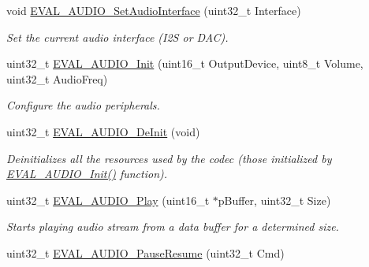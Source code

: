 \begin{DoxyCompactItemize}
\item 
void \hyperlink{group___s_t_m32_f4___d_i_s_c_o_v_e_r_y___a_u_d_i_o___c_o_d_e_c___exported___functions_gaeba4b4a5e51d99929d303b6cdf006641}{E\-V\-A\-L\-\_\-\-A\-U\-D\-I\-O\-\_\-\-Set\-Audio\-Interface} (uint32\-\_\-t Interface)
\begin{DoxyCompactList}\small\item\em Set the current audio interface (I2\-S or D\-A\-C). \end{DoxyCompactList}\item 
uint32\-\_\-t \hyperlink{group___s_t_m32_f4___d_i_s_c_o_v_e_r_y___a_u_d_i_o___c_o_d_e_c___exported___functions_gaeb1a379374e6e0ae4276ef087e213524}{E\-V\-A\-L\-\_\-\-A\-U\-D\-I\-O\-\_\-\-Init} (uint16\-\_\-t Output\-Device, uint8\-\_\-t Volume, uint32\-\_\-t Audio\-Freq)
\begin{DoxyCompactList}\small\item\em Configure the audio peripherals. \end{DoxyCompactList}\item 
uint32\-\_\-t \hyperlink{group___s_t_m32_f4___d_i_s_c_o_v_e_r_y___a_u_d_i_o___c_o_d_e_c___exported___functions_gaa7b87a9dee532c3f2b7b9be18f8c20e8}{E\-V\-A\-L\-\_\-\-A\-U\-D\-I\-O\-\_\-\-De\-Init} (void)
\begin{DoxyCompactList}\small\item\em Deinitializes all the resources used by the codec (those initialized by \hyperlink{group___s_t_m32_f4___d_i_s_c_o_v_e_r_y___a_u_d_i_o___c_o_d_e_c___private___functions_gaeb1a379374e6e0ae4276ef087e213524}{E\-V\-A\-L\-\_\-\-A\-U\-D\-I\-O\-\_\-\-Init()} function). \end{DoxyCompactList}\item 
uint32\-\_\-t \hyperlink{group___s_t_m32_f4___d_i_s_c_o_v_e_r_y___a_u_d_i_o___c_o_d_e_c___exported___functions_ga0422f1985733a86bdc2d8d42eeaafac5}{E\-V\-A\-L\-\_\-\-A\-U\-D\-I\-O\-\_\-\-Play} (uint16\-\_\-t $\ast$p\-Buffer, uint32\-\_\-t Size)
\begin{DoxyCompactList}\small\item\em Starts playing audio stream from a data buffer for a determined size. \end{DoxyCompactList}\item 
uint32\-\_\-t \hyperlink{group___s_t_m32_f4___d_i_s_c_o_v_e_r_y___a_u_d_i_o___c_o_d_e_c___exported___functions_ga6c6084dfd89cd5ea01440fef86031e18}{E\-V\-A\-L\-\_\-\-A\-U\-D\-I\-O\-\_\-\-Pause\-Resume} (uint32\-\_\-t Cmd)

\end{DoxyCompactItemize}
